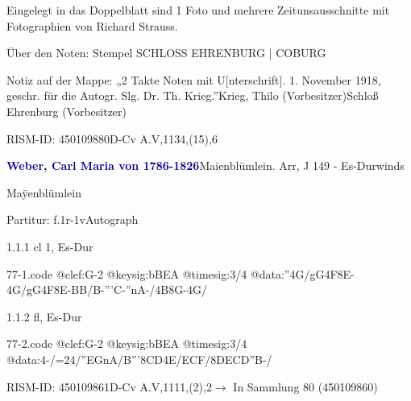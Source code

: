 \documentclass[a4paper, twocolumn, 11pt]{book}
\begin{document}
\newline %
\par Eingelegt in das Doppelblatt sind 1 Foto und mehrere Zeitunsausschnitte mit Fotographien von Richard Strauss.
\par Über den Noten: Stempel {\textquotedbl}SCHLOSS EHRENBURG | COBURG{\textquotedbl}
\par Notiz auf der Mappe: „2 Takte Noten mit U[nterschrift]. 1. November 1918, geschr. für die Autogr. Slg. Dr. Th. Krieg.”\newline Krieg, Thilo  (Vorbesitzer)\newline Schloß Ehrenburg  (Vorbesitzer)
\par RISM-ID: 450109880\newline D-Cv  A.V,1134,(15),6
\par \vspace{16pt} \textcolor{darkblue}{\textbf{Weber, Carl Maria von  1786-1826}}\hfillplus{[77]}\newline Maienblümlein. Arr, J 149 - Es-Dur\newline winds
\par \begin{itshape} Maÿenblümlein\end{itshape} 
\par \textcolor{darkblue}{}  Partitur: f.1r-1v\newline Autograph
\par 1.1.1  cl 1, Es-Dur  
\begin{filecontents*}{77-1.code}
@clef:G-2
@keysig:bBEA
@timesig:3/4
@data:''4G/gG4F8E-4G/gG4F8E-{BB}/B-'''C-''nA-/4B8G-4G/
\end{filecontents*}

\newline %
\par 1.1.2  fl, Es-Dur  
\begin{filecontents*}{77-2.code}
@clef:G-2
@keysig:bBEA
@timesig:3/4
@data:4-/=24/''EGnA/B'''{8CD}4E/ECF/{8DECD}''B-/
\end{filecontents*}

\newline %
\par RISM-ID: 450109861\newline D-Cv  A.V,1111,(2),2\newline $\rightarrow$ In Sammlung 80 (450109860)
      
\end{document}
